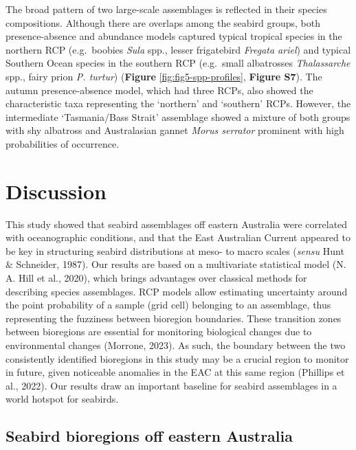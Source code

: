 \documentclass{article}
\begin{document}
\begin{linenumbers}
The broad pattern of two large-scale assemblages is reflected in their species compositions. Although there are overlaps among the seabird groups, both presence-absence and abundance models captured typical tropical species in the northern RCP (e.g.~boobies \emph{Sula} spp., lesser frigatebird \emph{Fregata ariel}) and typical Southern Ocean species in the southern RCP (e.g.~small albatrosses \emph{Thalassarche} spp., fairy prion \emph{P. turtur}) (\textbf{Figure} \ref{fig:fig5-spp-profiles}, \textbf{Figure S7}). The autumn presence-absence model, which had three RCPs, also showed the characteristic taxa representing the `northern' and `southern' RCPs. However, the intermediate `Tasmania/Bass Strait' assemblage showed a mixture of both groups with shy albatross and Australasian gannet \emph{Morus serrator} prominent with high probabilities of occurrence.

\hypertarget{discussion}{%
\section{Discussion}\label{discussion}}

This study showed that seabird assemblages off eastern Australia were correlated with oceanographic conditions, and that the East Australian Current appeared to be key in structuring seabird distributions at meso- to macro scales (\emph{sensu} Hunt \& Schneider, 1987). Our results are based on a multivariate statistical model (N. A. Hill et al., 2020), which brings advantages over classical methods for describing species assemblages. RCP models allow estimating uncertainty around the point probability of a sample (grid cell) belonging to an assemblage, thus representing the fuzziness between bioregion boundaries. These transition zones between bioregions are essential for monitoring biological changes due to environmental changes (Morrone, 2023). As such, the boundary between the two consistently identified bioregions in this study may be a crucial region to monitor in future, given noticeable anomalies in the EAC at this same region (Phillips et al., 2022). Our results draw an important baseline for seabird assemblages in a world hotspot for seabirds.

\hypertarget{seabird-bioregions-off-eastern-australia}{%
\subsection{Seabird bioregions off eastern Australia}\label{seabird-bioregions-off-eastern-australia}}


\end{linenumbers}
\end{document}
